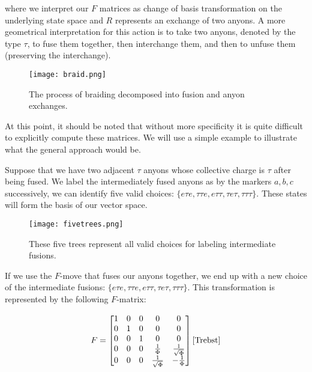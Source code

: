 where we interpret our $F$ matrices as change of basis transformation on the underlying state space and $R$ represents an exchange of two anyons. A more geometrical interpretation for this action is to take two anyons, denoted by the type $\tau$, to fuse them together, then interchange them, and then to unfuse them (preserving the interchange). 

\begin{figure}[H]
	\centering
	\texttt{[image: braid.png]}
	\caption{The process of braiding decomposed into fusion and anyon exchanges.}
\end{figure}

At this point, it should be noted that without more specificity it is quite difficult to explicitly compute these matrices. We will use a simple example to illustrate what the general approach would be.

\begin{example}
\end{example}
Suppose that we have two adjacent $\tau$ anyons whose collective charge is $\tau$ after being fused. We label the intermediately fused anyons as by the markers $a,b,c$ successively, we can identify five valid choices: $\{e\tau e,\tau\tau e, e\tau\tau, \tau e\tau, \tau\tau\tau\}$. These states will form the basis of our vector space.

\begin{figure}[H]
	\centering
	\texttt{[image: fivetrees.png]}
	\caption{These five trees represent all valid choices for labeling intermediate fusions.}
\end{figure}

If we use the $F$-move that fuses our anyons together, we end up with a new choice of the intermediate fusions: $\{e\tau e,\tau\tau e, e\tau\tau, \tau e\tau, \tau\tau\tau\}$. This transformation is represented by the following $F$-matrix:

\begin{equation}
	\begin{aligned}
		F = \begin{bmatrix}
				1 & 0 & 0 & 0 & 0 \\
				0 & 1 & 0 & 0 & 0 \\
				0 & 0 & 1 & 0 & 0 \\
				0 & 0 & 0 & \frac{1}{\Phi} & \frac{1}{\sqrt{\Phi}}\\
				0 & 0 & 0 &\frac{1}{\sqrt{\Phi}} & -\frac{1}{\Phi}
			\end{bmatrix}\cite{Trebst}
	\end{aligned}
\end{equation}

